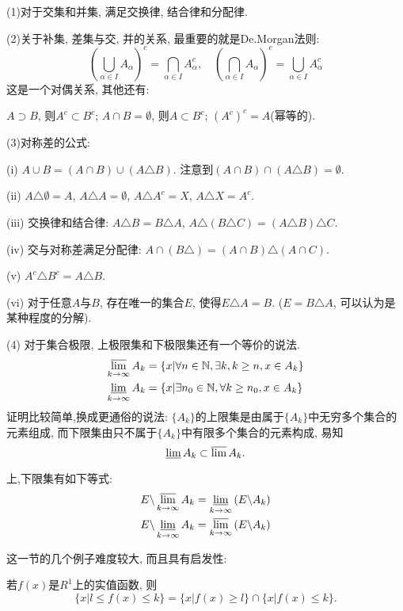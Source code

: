 \documentclass[12pt,a4paper,openany]{book}
\begin{document}
(1)对于交集和并集, 满足交换律, 结合律和分配律.

(2)关于补集, 差集与交, 并的关系, 最重要的就是De.Morgan法则:
$$
(\bigcup_{\alpha \in I}{A_{\alpha}})^c = \bigcap_{\alpha \in I}{A_{\alpha}^{c}}, \quad (\bigcap_{\alpha \in I}{A_{\alpha}})^c = \bigcup_{\alpha \in I}{A_{\alpha}^{c}}
$$
这是一个对偶关系, 其他还有:

$A \supset B$, 则$A^c \subset B^c$; $A \cap B = \emptyset$, 则$A \subset B^c$; $(A^c)^c = A$(幂等的).

(3)对称差的公式:

(i) $A \cup B = (A \cap B) \cup (A \triangle B)$. 注意到$(A \cap B) \cap (A \triangle B) = \emptyset$.

(ii) $A \triangle \emptyset = A$, $A \triangle A = \emptyset$, $A \triangle A^c = X$, $A \triangle X = A^c$.

(iii) 交换律和结合律: $A \triangle B = B \triangle A$, $A \triangle (B \triangle C) = (A \triangle B) \triangle C$.

(iv) 交与对称差满足分配律: $A \cap (B \triangle) = (A \cap B) \triangle (A \cap C)$.

(v) $A^c \triangle B^c = A \triangle B$.

(vi) 对于任意$A$与$B$, 存在唯一的集合$E$, 使得$E \triangle A = B$. ($E = B \triangle A$, 可以认为是某种程度的分解).

(4) 对于集合极限, 上极限集和下极限集还有一个等价的说法.
$$
\begin{aligned}
\varlimsup_{k \rightarrow \infty}{A_k} &= \{x | \forall n \in \mathbb{N}, \exists k, k \ge n, x \in A_k \} \\
\varliminf_{k \rightarrow \infty}{A_k} &= \{x | \exists n_0 \in \mathbb{N}, \forall k \ge n_0, x \in A_k \}
\end{aligned}
$$
证明比较简单,换成更通俗的说法: $\{A_k\}$的上限集是由属于$\{A_k\}$中无穷多个集合的元素组成, 而下限集由只不属于$\{A_k\}$中有限多个集合的元素构成, 易知
$$
\varliminf{A_k} \subset \varlimsup{A_k}.
$$

上,下限集有如下等式:
$$
\begin{aligned}
E \backslash \varlimsup_{k \rightarrow \infty}{A_k} &= \varliminf_{k \rightarrow \infty}{(E \backslash A_k)} \\
E \backslash \varliminf_{k \rightarrow \infty}{A_k} &= \varlimsup_{k \rightarrow \infty}{(E \backslash A_k)}
\end{aligned}
$$

这一节的几个例子难度较大, 而且具有启发性:

若$f(x)$是$R^1$上的实值函数, 则
$$
\{x | l \le f(x) \le k\} = \{x | f(x) \ge l\} \cap \{x | f(x) \le k\}.
$$
\end{document}
